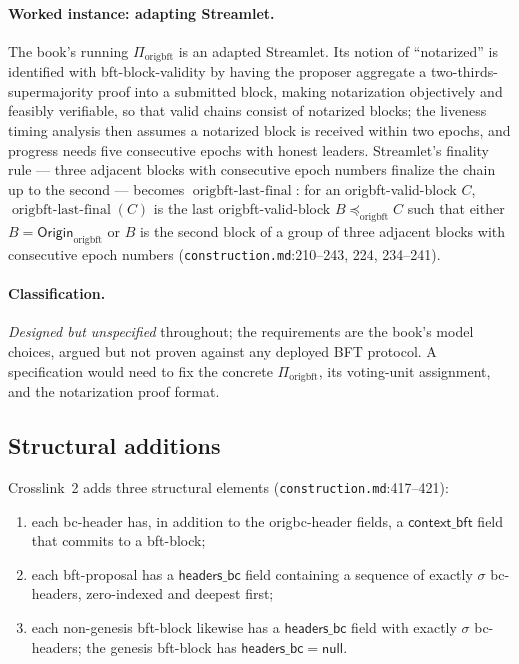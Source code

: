 \documentclass[11pt,a4paper]{article}
\theoremstyle{definition}
\begin{document}
\paragraph{Worked instance: adapting Streamlet.} The book's running
$\Pi_{\mathrm{origbft}}$ is an adapted Streamlet. Its notion of
``notarized'' is identified with bft-block-validity by having the
proposer aggregate a two-thirds-supermajority proof into a submitted
block, making notarization objectively and feasibly verifiable, so that
valid chains consist of notarized blocks; the liveness timing analysis
then assumes a notarized block is received within two epochs, and
progress needs five consecutive epochs with honest leaders. Streamlet's
finality rule --- three adjacent blocks with consecutive epoch numbers
finalize the chain up to the second --- becomes
$\operatorname{origbft\text{-}last\text{-}final}$: for an
origbft-valid-block $C$,
$\operatorname{origbft\text{-}last\text{-}final}(C)$ is the last
origbft-valid-block $B \preceq_{\mathrm{origbft}} C$ such that either $B =
\mathsf{Origin}_{\mathrm{origbft}}$ or $B$ is the second block of a group
of three adjacent blocks with consecutive epoch numbers
(\texttt{construction.md}:210--243, 224, 234--241).

\paragraph{Classification.} \emph{Designed but unspecified} throughout;
the requirements are the book's model choices, argued but not proven
against any deployed BFT protocol. A specification would need to fix the
concrete $\Pi_{\mathrm{origbft}}$, its voting-unit assignment, and the
notarization proof format.

\subsection{Structural additions}\label{sec:xl-structure}

Crosslink~2 adds three structural elements
(\texttt{construction.md}:417--421):
\begin{enumerate}[label=(\arabic*)]
\item each bc-header has, in addition to the origbc-header fields, a
  $\mathsf{context\_bft}$ field that commits to a bft-block;
\item each bft-proposal has a $\mathsf{headers\_bc}$ field containing a
  sequence of exactly $\sigma$ bc-headers, zero-indexed and deepest
  first;
\item each non-genesis bft-block likewise has a $\mathsf{headers\_bc}$
  field with exactly $\sigma$ bc-headers; the genesis bft-block has
  $\mathsf{headers\_bc} = \mathsf{null}$.
\end{enumerate}
\end{document}
